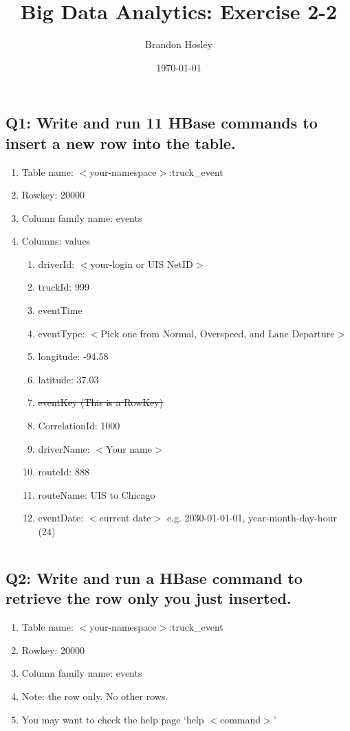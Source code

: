 \documentclass[]{article}
\title{Big Data Analytics: Exercise 2-2}
\author{Brandon Hosley}
\date{\today}
\begin{document}
\maketitle

\subsection*{Q1: Write and run 11 HBase commands to insert a new row into the table.} 
\begin{enumerate}[before=\itshape,font=\normalfont,label=\alph*.]
	\item Table name: $<$your-namespace$>$:truck\_event
	\item Rowkey: 20000
	\item Column family name: events
	\item Columns: values
	\begin{enumerate}[label=\roman*.]
		\item driverId: $<$your-login or UIS NetID$>$
		\item truckId: 999
		\item eventTime
		\item eventType: $<$Pick one from Normal, Overspeed, and Lane Departure$>$
		\item longitude: -94.58
		\item latitude: 37.03
		\item \sout{ eventKey (This is a RowKey) }
		\item CorrelationId: 1000
		\item driverName: $<$Your name$>$
		\item routeId: 888
		\item routeName: UIS to Chicago
		\item eventDate: $<$current date$>$ e.g. 2030-01-01-01, year-month-day-hour (24)
	\end{enumerate}
\end{enumerate}

\begin{verbatim}

\end{verbatim}

\subsection*{Q2: Write and run a HBase command to retrieve the row only you just inserted.} 
\begin{enumerate}[before=\itshape,font=\normalfont,label=\alph*.]
	\item Table name: $<$your-namespace$>$:truck\_event
	\item Rowkey: 20000
	\item Column family name: events
	\item Note: the row only. No other rows.
	\item You may want to check the help page ‘help $<$command$>$’
\end{enumerate}
\end{document}

